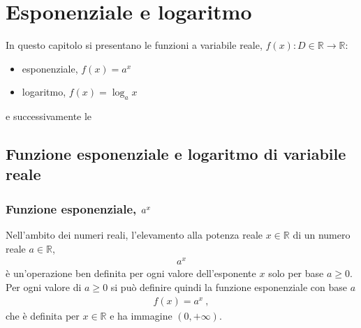 \documentclass[letterpaper,10pt,italian]{jupyterBook}
\begin{document}
\sphinxstepscope


\chapter{Esponenziale e logaritmo}
\label{\detokenize{ch/precalculus/exponential_logarithm:esponenziale-e-logaritmo}}\label{\detokenize{ch/precalculus/exponential_logarithm:math-hs-exp-log}}\label{\detokenize{ch/precalculus/exponential_logarithm::doc}}
\sphinxAtStartPar
In questo capitolo si presentano le funzioni a variabile reale, \(f(x): D \in \mathbb{R} \rightarrow \mathbb{R}\):
\begin{itemize}
\item {} 
\sphinxAtStartPar
esponenziale, \(f(x) = a^x\)

\item {} 
\sphinxAtStartPar
logaritmo, \(f(x) = \log_a x\)

\end{itemize}

\sphinxAtStartPar
e successivamente le {\hyperref[\detokenize{ch/precalculus::doc}]{}}


\section{Funzione esponenziale e logaritmo di variabile reale}
\label{\detokenize{ch/precalculus/exponential_logarithm:funzione-esponenziale-e-logaritmo-di-variabile-reale}}

\subsection{Funzione esponenziale, \protect\(a^x\protect\)}
\label{\detokenize{ch/precalculus/exponential_logarithm:funzione-esponenziale-a-x}}\label{\detokenize{ch/precalculus/exponential_logarithm:math-hs-exp-ax-def}}
\sphinxAtStartPar
Nell’ambito dei numeri reali, l’elevamento alla potenza reale \(x \in \mathbb{R}\) di un numero reale \(a \in \mathbb{R}\),
\begin{equation*}
\begin{split}a^x\end{split}
\end{equation*}
\sphinxAtStartPar
è un’operazione ben definita per ogni valore dell’esponente \(x\) solo per base \(a \geq 0\). Per ogni valore di \(a \geq 0\) si può definire quindi la funzione esponenziale con base \(a\)
\begin{equation*}
\begin{split}f(x) = a^x \ ,\end{split}
\end{equation*}
\sphinxAtStartPar
che è definita per \(x \in \mathbb{R}\) e ha immagine \((0, +\infty)\).
\end{document}
